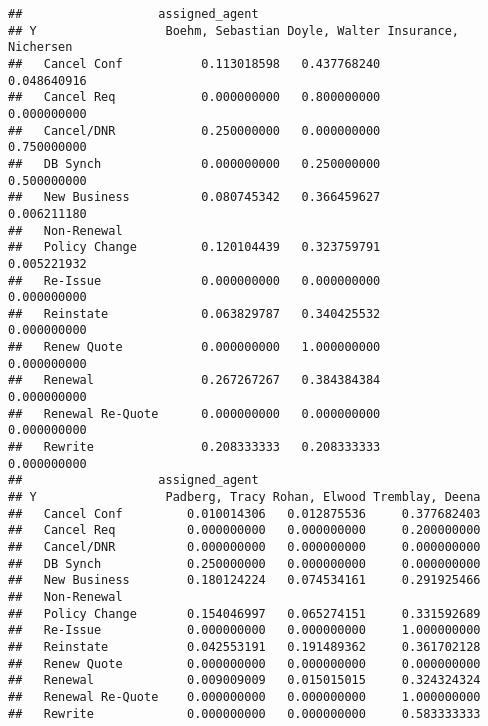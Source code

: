 \documentclass[]{article}
\begin{document}
\begin{verbatim}
##                   assigned_agent
## Y                  Boehm, Sebastian Doyle, Walter Insurance, Nichersen
##   Cancel Conf           0.113018598   0.437768240          0.048640916
##   Cancel Req            0.000000000   0.800000000          0.000000000
##   Cancel/DNR            0.250000000   0.000000000          0.750000000
##   DB Synch              0.000000000   0.250000000          0.500000000
##   New Business          0.080745342   0.366459627          0.006211180
##   Non-Renewal                                                         
##   Policy Change         0.120104439   0.323759791          0.005221932
##   Re-Issue              0.000000000   0.000000000          0.000000000
##   Reinstate             0.063829787   0.340425532          0.000000000
##   Renew Quote           0.000000000   1.000000000          0.000000000
##   Renewal               0.267267267   0.384384384          0.000000000
##   Renewal Re-Quote      0.000000000   0.000000000          0.000000000
##   Rewrite               0.208333333   0.208333333          0.000000000
##                   assigned_agent
## Y                  Padberg, Tracy Rohan, Elwood Tremblay, Deena
##   Cancel Conf         0.010014306   0.012875536     0.377682403
##   Cancel Req          0.000000000   0.000000000     0.200000000
##   Cancel/DNR          0.000000000   0.000000000     0.000000000
##   DB Synch            0.250000000   0.000000000     0.000000000
##   New Business        0.180124224   0.074534161     0.291925466
##   Non-Renewal                                                  
##   Policy Change       0.154046997   0.065274151     0.331592689
##   Re-Issue            0.000000000   0.000000000     1.000000000
##   Reinstate           0.042553191   0.191489362     0.361702128
##   Renew Quote         0.000000000   0.000000000     0.000000000
##   Renewal             0.009009009   0.015015015     0.324324324
##   Renewal Re-Quote    0.000000000   0.000000000     1.000000000
##   Rewrite             0.000000000   0.000000000     0.583333333
\end{verbatim}
\end{document}
